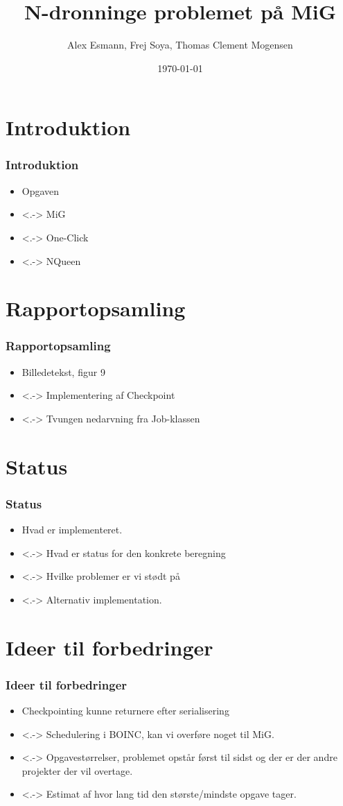 \documentclass{beamer}
\title{N-dronninge problemet på MiG}
\author{Alex Esmann, Frej Soya, Thomas Clement Mogensen}
\date{\today}
\begin{document}
\frame{\titlepage}
\section{Introduktion}
\frame
{
	\frametitle{Introduktion}

	\begin{itemize}
	\item<1-> Opgaven
	\item<.-> MiG
	\item<.-> One-Click
	\item<.-> NQueen
	\end{itemize}
}


\section{Rapportopsamling}
\frame
{
  \frametitle{Rapportopsamling}

  \begin{itemize}
  \item<1-> Billedetekst, figur 9
  \item<.-> Implementering af Checkpoint 
  \item<.-> Tvungen nedarvning fra Job-klassen
  \end{itemize}
}

\section{Status}
\frame
{
  \frametitle{Status}

  \begin{itemize}
  \item<1-> Hvad er implementeret.
  \item<.-> Hvad er status for den konkrete beregning
  \item<.-> Hvilke problemer er vi stødt på
  \item<.-> Alternativ implementation.
  \end{itemize}
}

\section{Ideer til forbedringer}
\frame
{
  \frametitle{Ideer til forbedringer}

  \begin{itemize}
  \item<1-> Checkpointing kunne returnere efter serialisering
  \item<.-> Schedulering i BOINC, kan vi overføre noget til MiG.
  \item<.-> Opgavestørrelser, problemet opstår først til sidst og der er der andre projekter der vil overtage.      
	\item<.-> Estimat af hvor lang tid den største/mindste opgave tager. 
  \end{itemize}
}
\end{document}
